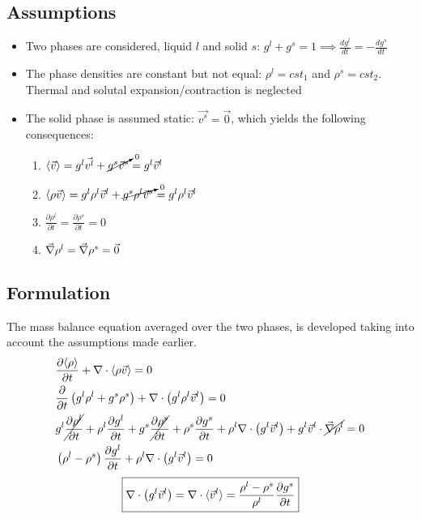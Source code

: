 \subsection{Assumptions}
\begin{itemize}
\item Two phases are considered, liquid $l$ and solid $s$: $g^l+g^s =1 \implies \frac{dg^l}{dt} =- \frac{dg^s}{dt}$ 
\item The phase densities are constant but not equal: $ \rho^l=cst_1 $ and $ \rho^s=cst_2 $. Thermal and solutal expansion/contraction
is neglected
\item The solid phase is assumed static: $\vec{v^s}=\vec{0}$, which yields the following consequences:
\begin{enumerate}
\item $\langle \vec{v} \rangle= g^l \vec{v^l} + \cancelto{0}{g^s \vec{v}^s} = g^l \vec{v}^l $ 
\item $\langle \rho \vec{v} \rangle = g^l \rho^l \vec{v}^l + \cancelto{0}{g^s \rho^l \vec{v}^s} = g^l \rho^l \vec{v}^l $ 
\item $ \frac{\partial \rho^l }{\partial t} = \frac{\partial \rho^s }{\partial t} = 0 $
\item $ \vec{\nabla} \rho^l = \vec{\nabla} \rho^s = \vec{0} $  
\end{enumerate}
\end{itemize}
\subsection{Formulation}
The mass balance equation averaged over the two phases, is developed taking into account the assumptions made earlier.
\begin{subequations}
\begin{align}
& \frac{\partial \langle \rho \rangle}{\partial t} + \nabla \cdot \langle \rho \vec{v} \rangle  = 0 \\ 
& \frac{\partial }{\partial t} \left(  g^l \rho^l + g^s \rho^s \right) + \nabla \cdot \left(  g^l \rho^l \vec{v}^l \right) = 0 \\ 
& g^l \cancel{\frac{\partial \rho^l }{\partial t}} + \rho^l \frac{\partial  g^l }{\partial t} 
	+ g^s \cancel{\frac{\partial \rho^s }{\partial t}} + \rho^s \frac{\partial  g^s }{\partial t} 
	+ \rho^l \nabla \cdot \left(  g^l \vec{v}^l \right) 
	+ g^l \vec{v}^l \cdot  \cancel{ \vec{\nabla} \rho^l }	 = 0 \\
& \left(  \rho^l - \rho^s  \right) \frac{\partial  g^l }{\partial t} + \rho^l \nabla \cdot \left(  g^l \vec{v}^l \right)  = 0
\end{align}
\end{subequations}
\begin{align}
\label{eq:mass_balance}
 \boxed{\nabla \cdot \left(  g^l \vec{v}^l \right) 
 	= \nabla \cdot \langle \vec{v}^l \rangle 
 	= \frac{\rho^l-\rho^s}{\rho^l} \frac{\partial  g^s }{\partial t}}
\end{align}
